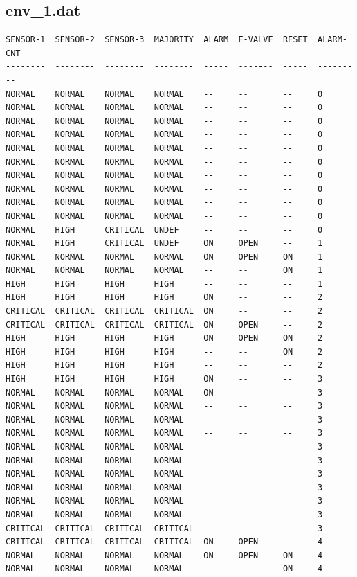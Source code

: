 \documentclass[a4paper, titlepage]{article}
\begin{document}
\subsection{env\_1.dat}
{\small
\begin{lstlisting}
SENSOR-1  SENSOR-2  SENSOR-3  MAJORITY  ALARM  E-VALVE  RESET  ALARM-CNT
--------  --------  --------  --------  -----  -------  -----  ---------
NORMAL    NORMAL    NORMAL    NORMAL    --     --       --     0
NORMAL    NORMAL    NORMAL    NORMAL    --     --       --     0
NORMAL    NORMAL    NORMAL    NORMAL    --     --       --     0
NORMAL    NORMAL    NORMAL    NORMAL    --     --       --     0
NORMAL    NORMAL    NORMAL    NORMAL    --     --       --     0
NORMAL    NORMAL    NORMAL    NORMAL    --     --       --     0
NORMAL    NORMAL    NORMAL    NORMAL    --     --       --     0
NORMAL    NORMAL    NORMAL    NORMAL    --     --       --     0
NORMAL    NORMAL    NORMAL    NORMAL    --     --       --     0
NORMAL    NORMAL    NORMAL    NORMAL    --     --       --     0
NORMAL    HIGH      CRITICAL  UNDEF     --     --       --     0
NORMAL    HIGH      CRITICAL  UNDEF     ON     OPEN     --     1
NORMAL    NORMAL    NORMAL    NORMAL    ON     OPEN     ON     1
NORMAL    NORMAL    NORMAL    NORMAL    --     --       ON     1
HIGH      HIGH      HIGH      HIGH      --     --       --     1
HIGH      HIGH      HIGH      HIGH      ON     --       --     2
CRITICAL  CRITICAL  CRITICAL  CRITICAL  ON     --       --     2
CRITICAL  CRITICAL  CRITICAL  CRITICAL  ON     OPEN     --     2
HIGH      HIGH      HIGH      HIGH      ON     OPEN     ON     2
HIGH      HIGH      HIGH      HIGH      --     --       ON     2
HIGH      HIGH      HIGH      HIGH      --     --       --     2
HIGH      HIGH      HIGH      HIGH      ON     --       --     3
NORMAL    NORMAL    NORMAL    NORMAL    ON     --       --     3
NORMAL    NORMAL    NORMAL    NORMAL    --     --       --     3
NORMAL    NORMAL    NORMAL    NORMAL    --     --       --     3
NORMAL    NORMAL    NORMAL    NORMAL    --     --       --     3
NORMAL    NORMAL    NORMAL    NORMAL    --     --       --     3
NORMAL    NORMAL    NORMAL    NORMAL    --     --       --     3
NORMAL    NORMAL    NORMAL    NORMAL    --     --       --     3
NORMAL    NORMAL    NORMAL    NORMAL    --     --       --     3
NORMAL    NORMAL    NORMAL    NORMAL    --     --       --     3
NORMAL    NORMAL    NORMAL    NORMAL    --     --       --     3
CRITICAL  CRITICAL  CRITICAL  CRITICAL  --     --       --     3
CRITICAL  CRITICAL  CRITICAL  CRITICAL  ON     OPEN     --     4
NORMAL    NORMAL    NORMAL    NORMAL    ON     OPEN     ON     4
NORMAL    NORMAL    NORMAL    NORMAL    --     --       ON     4

\end{lstlisting}
}
\end{document}

